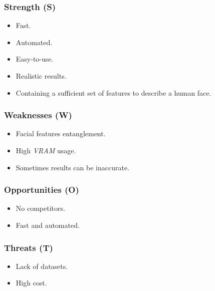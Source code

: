 \subsubsection{Strength (S)}

\begin{itemize}
    \item Fast.
    \item Automated.
    \item Easy-to-use.
    \item Realistic results.
    \item Containing a sufficient set of features to describe a human face.
\end{itemize}

\subsubsection{Weaknesses (W)}

\begin{itemize}
    \item Facial features entanglement.
    \item High \emph{VRAM} usage.
    \item Sometimes results can be inaccurate.
\end{itemize}

\subsubsection{Opportunities (O)} 

\begin{itemize}
    \item No competitors.
    \item Fast and automated.
\end{itemize}

\subsubsection{Threats (T)}

\begin{itemize}
    \item Lack of datasets.
    \item High cost.
\end{itemize}
